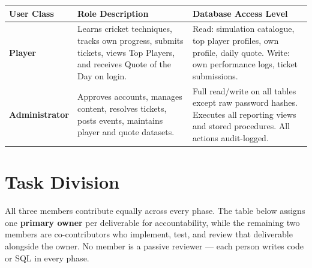 \documentclass[12pt,a4paper]{article}
\begin{document}
\begin{longtable}{>{\bfseries}p{3cm} p{5.5cm} p{5cm}}
    \toprule
    User Class & Role Description & Database Access Level \\
    \midrule
    \endhead

    Player &
    Learns cricket techniques, tracks own progress, submits tickets,
    views Top Players, and receives Quote of the Day on login. &
    Read: simulation catalogue, top player profiles, own profile, daily
    quote. Write: own performance logs, ticket submissions. \\[6pt]

    Administrator &
    Approves accounts, manages content, resolves tickets, posts events,
    maintains player and quote datasets. &
    Full read/write on all tables except raw password hashes. Executes
    all reporting views and stored procedures. All actions audit-logged. \\

    \bottomrule
\end{longtable}

\section{Task Division}

All three members contribute equally across every phase. The table below assigns
one \textbf{primary owner} per deliverable for accountability, while the remaining
two members are co-contributors who implement, test, and review that deliverable
alongside the owner. No member is a passive reviewer --- each person writes code
or SQL in every phase.
\end{document}
